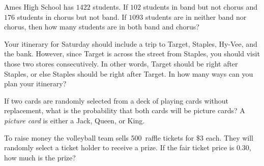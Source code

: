 \documentclass[answers,addpoints,12pt]{exam}
\begin{document}
\begin{questions}
\question Ames High School has $1422$ students.
If $102$ students in band but not chorus and
$176$ students in chorus but not band.
If $1093$ students are in neither band nor chorus,
then how many students are in both band and chorus?

\question[10] Your itinerary for Saturday should
include a trip to Target, Staples, Hy-Vee, and the bank.
However, since Target is across the street from Staples,
you should visit those two stores consecutively. In other
words, Target should be right after Staples, or else
Staples should be right after Target. In how many ways
can you plan your itinerary?

\question[10] If two cards are randomly selected from a deck
of playing cards without replacement, what is the probability that both cards
will be picture cards?  A {\em picture card} is either a Jack, Queen, or King.

\question[10] To raise money the volleyball team sells 500~raffle tickets
for $\$3$ each. They will randomly select a ticket holder to receive
a prize. If the fair ticket price is $0.30$, how much is the prize?

\end{questions}

\vfill
\begin{center}\gradetable[h][questions]\end{center}
\end{document}
